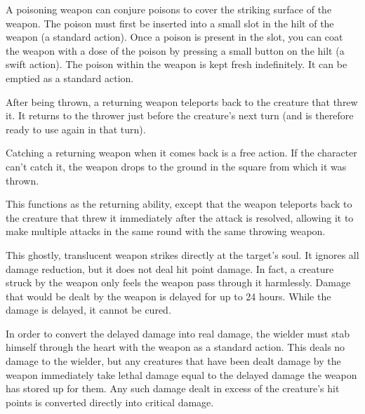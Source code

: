 
 A poisoning weapon can conjure poisons to cover the striking surface of the weapon. The poison must first be inserted into a small slot in the hilt of the weapon (a standard action). Once a poison is present in the slot, you can coat the weapon with a dose of the poison by pressing a small button on the hilt (a swift action). The poison within the weapon is kept fresh indefinitely. It can be emptied as a standard action. 


 After being thrown, a returning weapon teleports back to the creature that threw it. It returns to the thrower just before the creature's next turn (and is therefore ready to use again in that turn).

Catching a returning weapon when it comes back is a free action. If the character can't catch it, the weapon drops to the ground in the square from which it was thrown.


 This functions as the returning ability, except that the weapon teleports back to the creature that threw it immediately after the attack is resolved, allowing it to make multiple attacks in the same round with the same throwing weapon. 


 This ghostly, translucent weapon strikes directly at the target's soul. It ignores all damage reduction, but it does not deal hit point damage. In fact, a creature struck by the weapon only feels the weapon pass through it harmlessly. Damage that would be dealt by the weapon is delayed for up to 24 hours. While the damage is delayed, it cannot be cured.

In order to convert the delayed damage into real damage, the wielder must stab himself through the heart with the weapon as a standard action. This deals no damage to the wielder, but any creatures that have been dealt damage by the weapon immediately take lethal damage equal to the delayed damage the weapon has stored up for them. Any such damage dealt in excess of the creature's hit points is converted directly into critical damage.

